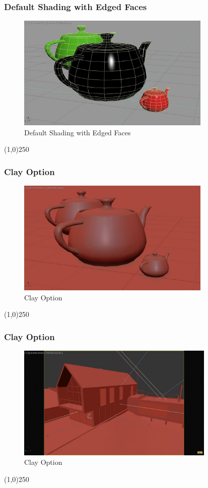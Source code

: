\begin{frame}
\frametitle{Default Shading with Edged Faces}
\begin{figure}
	\centering
	\includegraphics[height=5.5cm]{img/ViewportOptions/DefaultShadingEdgedFaces.jpg}
	\caption{Default Shading with Edged Faces}
	\label{fig:DefaultEdged}
\end{figure}
\end{frame}
\begin{center}\line(1,0){250}\end{center}

\begin{frame}
\frametitle{Clay Option}
\begin{figure}
	\centering
	\includegraphics[height=5.5cm]{img/ViewportOptions/Clay.jpg}
	\caption{Clay Option}
	\label{fig:ClayOption}
\end{figure}
\end{frame}
\begin{center}\line(1,0){250}\end{center}


\begin{frame}
\frametitle{Clay Option}
\begin{figure}
	\centering
	\includegraphics[height=5.5cm]{img/ViewportOptions/ClayHouse.jpg}
	\caption{Clay Option}
	\label{fig:ClayOption}
\end{figure}
\end{frame}
\begin{center}\line(1,0){250}\end{center}



